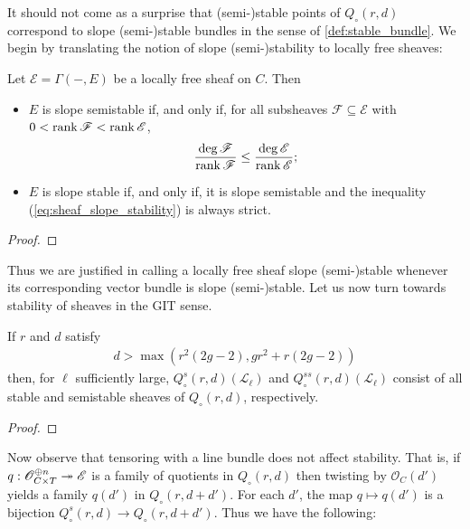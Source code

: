 \documentclass[12pt]{ociamthesis}  %
\begin{document}
It should not come as a surprise that (semi-)stable points of
$Q_\circ(r,d)$ correspond to slope (semi-)stable bundles
in the sense of \ref{def:stable_bundle}.
We begin by translating the notion of slope (semi-)stability to
locally free sheaves:

\begin{lemma}
  Let $\mathscr E=\Gamma(-,E)$ be a locally free sheaf on $C$.
  Then
  \begin{itemize}
    \item $E$ is slope semistable if, and only if, for all subsheaves
          $\mathscr F\subseteq\mathscr E$ with $0<\operatorname{rank}\mathscr F<\operatorname{rank}\mathscr E$,
          \begin{align}\label{eq:sheaf_slope_stability}
            \frac{\deg\mathscr F}{\operatorname{rank}\mathscr F}\leq\frac{\deg\mathscr E}{\operatorname{rank}\mathscr E};
          \end{align}
    \item $E$ is slope stable if, and only if, it is slope semistable
          and the inequality (\ref{eq:sheaf_slope_stability}) is always strict.
  \end{itemize}
  \begin{proof}
    \missingproof
  \end{proof}
\end{lemma}

Thus we are justified in calling a locally free sheaf slope (semi-)stable
whenever its corresponding vector bundle is slope (semi-)stable. Let us now turn
towards stability of sheaves in the GIT sense.

\begin{theorem}
  If $r$ and $d$ satisfy
  \begin{align*}
    d > \max(r^2(2g-2), gr^2 + r(2g-2))
  \end{align*}
  then, for $\ell$ sufficiently large,
  $Q^s_\circ(r,d)(\mathscr L_\ell)$ and $Q^{ss}_\circ(r,d)(\mathscr L_\ell)$
  consist of all stable and semistable sheaves of $Q_\circ(r,d)$,
  respectively.
  \begin{proof}
    \missingproof
  \end{proof}
\end{theorem}

Now observe that tensoring with a line bundle does not affect
stability. That is, if $q:\mathscr O^{\oplus n}_{C\times T} \twoheadrightarrow \mathscr E$
is a family of quotients in $Q_\circ(r,d)$ then twisting by
$\mathscr O_C(d')$ yields a family $q(d')$ in $Q_\circ(r,d+d')$.
For each $d'$, the map $q \mapsto q(d')$ is a bijection
$Q^s_\circ(r,d)\to Q_\circ(r,d+d')$. Thus we have the following:
\end{document}
